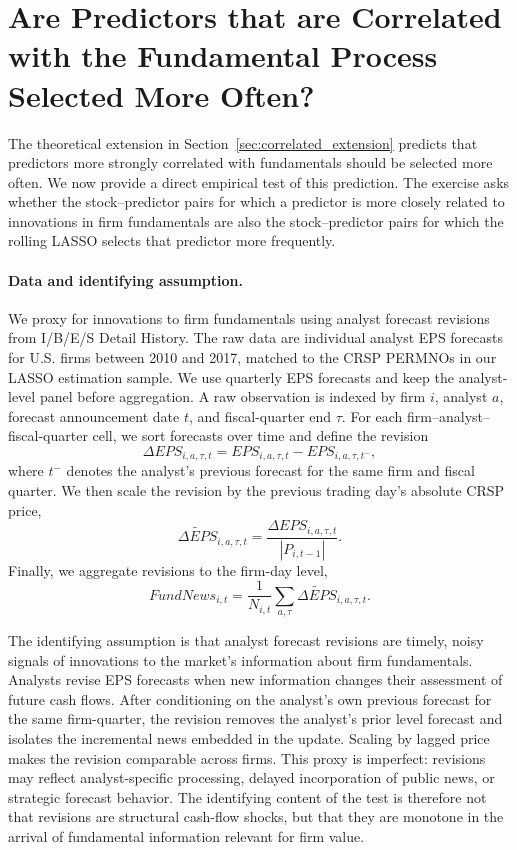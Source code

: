 \section{Are Predictors that are Correlated with the Fundamental Process Selected More Often?}
\label{sec:fundamental_revisions_selection}

The theoretical extension in Section~\ref{sec:correlated_extension} predicts that predictors more strongly correlated with fundamentals should be selected more often. We now provide a direct empirical test of this prediction. The exercise asks whether the stock--predictor pairs for which a predictor is more closely related to innovations in firm fundamentals are also the stock--predictor pairs for which the rolling LASSO selects that predictor more frequently.

\paragraph{Data and identifying assumption.}

We proxy for innovations to firm fundamentals using analyst forecast revisions from I/B/E/S Detail History. The raw data are individual analyst EPS forecasts for U.S. firms between 2010 and 2017, matched to the CRSP PERMNOs in our LASSO estimation sample. We use quarterly EPS forecasts and keep the analyst-level panel before aggregation. A raw observation is indexed by firm $i$, analyst $a$, forecast announcement date $t$, and fiscal-quarter end $\tau$. For each firm--analyst--fiscal-quarter cell, we sort forecasts over time and define the revision
\[
\Delta EPS_{i,a,\tau,t}
= EPS_{i,a,\tau,t}-EPS_{i,a,\tau,t^-},
\]
where $t^-$ denotes the analyst's previous forecast for the same firm and fiscal quarter. We then scale the revision by the previous trading day's absolute CRSP price,
\[
\widetilde{\Delta EPS}_{i,a,\tau,t}
=\frac{\Delta EPS_{i,a,\tau,t}}{|P_{i,t-1}|}.
\]
Finally, we aggregate revisions to the firm-day level,
\[
FundNews_{i,t}
=\frac{1}{N_{i,t}}\sum_{a,\tau}\widetilde{\Delta EPS}_{i,a,\tau,t}.
\]

The identifying assumption is that analyst forecast revisions are timely, noisy signals of innovations to the market's information about firm fundamentals. Analysts revise EPS forecasts when new information changes their assessment of future cash flows. After conditioning on the analyst's own previous forecast for the same firm-quarter, the revision removes the analyst's prior level forecast and isolates the incremental news embedded in the update. Scaling by lagged price makes the revision comparable across firms. This proxy is imperfect: revisions may reflect analyst-specific processing, delayed incorporation of public news, or strategic forecast behavior. The identifying content of the test is therefore not that revisions are structural cash-flow shocks, but that they are monotone in the arrival of fundamental information relevant for firm value.


